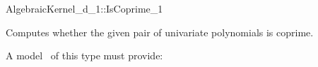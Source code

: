\begin{ccRefConcept}{AlgebraicKernel_d_1::IsCoprime_1}

\ccDefinition
Computes whether the given pair of univariate polynomials is coprime. 
 
\ccRefines 
{} 

\ccOperations
{}

A model \ccVar\ of this type must provide:

{}

\end{ccRefConcept}
